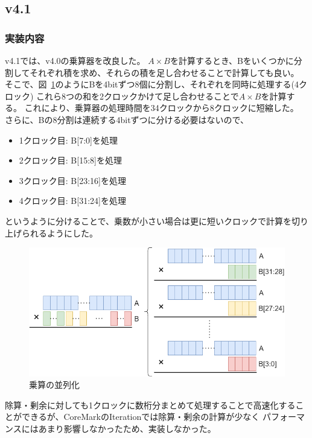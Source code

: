 \documentclass[dvipdfmx,10pt,a4paper,titlepage]{jsarticle}
\begin{document}
    \subsection{v4.1}
    \subsubsection{実装内容}\label{sec:v4.1}
    v4.1では、v4.0の乗算器を改良した。
    $A\times B$を計算するとき、Bをいくつかに分割してそれぞれ積を求め、それらの積を足し合わせることで計算しても良い。
    そこで、図~\ref{fig:multiplier2}のようにBを4bitずつ8個に分割し、それぞれを同時に処理する(4クロック)
    これら8つの和を2クロックかけて足し合わせることで$A\times B$を計算する。
    これにより、乗算器の処理時間を34クロックから8クロックに短縮した。
    さらに、Bの8分割は連続する4bitずつに分ける必要はないので、
    \begin{itemize}
        \item 1クロック目: B[7:0]を処理
        \item 2クロック目: B[15:8]を処理
        \item 3クロック目: B[23:16]を処理
        \item 4クロック目: B[31:24]を処理
    \end{itemize}
    というように分けることで、乗数が小さい場合は更に短いクロックで計算を切り上げられるようにした。
    \begin{figure}[h]
        \centering
        \includegraphics[width=12cm]{figure/mul_split.png}
        \caption{乗算の並列化}\label{fig:multiplier2}
    \end{figure}

    除算・剰余に対しても1クロックに数桁分まとめて処理することで高速化することができるが、CoreMarkのIterationでは除算・剰余の計算が少なく
    パフォーマンスにはあまり影響しなかったため、実装しなかった。
\end{document}
